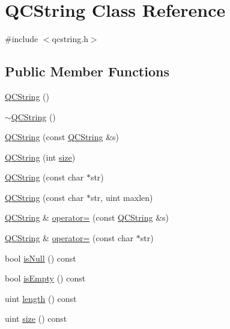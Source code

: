 \hypertarget{class_q_c_string}{}\section{Q\+C\+String Class Reference}
\label{class_q_c_string}


{\ttfamily \#include $<$qcstring.\+h$>$}

\subsection*{Public Member Functions}
\begin{DoxyCompactItemize}
\item 
\mbox{\hyperlink{class_q_c_string_ac81b67245a4667f5f257e75b2f99e278}{Q\+C\+String}} ()
\item 
\mbox{\hyperlink{class_q_c_string_a285551aa9238c4ee4473ba136bf4431a}{$\sim$\+Q\+C\+String}} ()
\item 
\mbox{\hyperlink{class_q_c_string_abf5e7eee86ecd3982c4b1315bc181cff}{Q\+C\+String}} (const \mbox{\hyperlink{class_q_c_string}{Q\+C\+String}} \&s)
\item 
\mbox{\hyperlink{class_q_c_string_a5a6639003e7bb8bb95189445649e0c2a}{Q\+C\+String}} (int \mbox{\hyperlink{class_q_c_string_ac084f55ab51f8b277cf01bb6e04f16ed}{size}})
\item 
\mbox{\hyperlink{class_q_c_string_a2286f03edc20befca29cd2b2f57de1f6}{Q\+C\+String}} (const char $\ast$str)
\item 
\mbox{\hyperlink{class_q_c_string_a0a7f38230a080e7583bf2747d587cc7d}{Q\+C\+String}} (const char $\ast$str, uint maxlen)
\item 
\mbox{\hyperlink{class_q_c_string}{Q\+C\+String}} \& \mbox{\hyperlink{class_q_c_string_a2f76b7f0c570b83ed75e8891cf2736b6}{operator=}} (const \mbox{\hyperlink{class_q_c_string}{Q\+C\+String}} \&s)
\item 
\mbox{\hyperlink{class_q_c_string}{Q\+C\+String}} \& \mbox{\hyperlink{class_q_c_string_aff5d046c512aee21b575abb2b7528282}{operator=}} (const char $\ast$str)
\item 
bool \mbox{\hyperlink{class_q_c_string_a31246261e7f2ae130c9235969b79075a}{is\+Null}} () const
\item 
bool \mbox{\hyperlink{class_q_c_string_a621c4090d69ad7d05ef8e5234376c3d8}{is\+Empty}} () const
\item 
uint \mbox{\hyperlink{class_q_c_string_ac52596733e9110b778019946d73fb268}{length}} () const
\item 
uint \mbox{\hyperlink{class_q_c_string_ac084f55ab51f8b277cf01bb6e04f16ed}{size}} () const

\end{DoxyCompactItemize}
